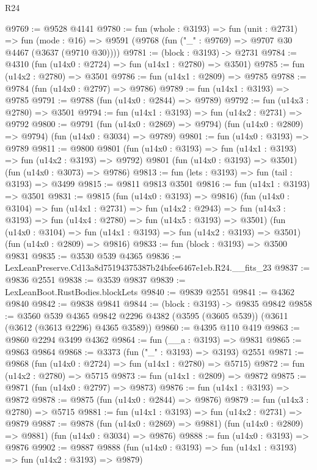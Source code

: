 \begin{lexlean}{R24}
\begin{coremodule}
@9769 := @9528 @4141
@9780 := fun (whole : @3193) =>
  fun (unit : @2731) =>
  fun (mode : @16) => @9591 (@9768 (fun ("_" : @9769) => @9707 @30 @4467 (@3637 (@9710 @30))))
@9781 := (block : @3193) -> @2731
@9784 := @4310 (fun (u14x0 : @2724) => fun (u14x1 : @2780) => @3501)
@9785 := fun (u14x2 : @2780) => @3501
@9786 := fun (u14x1 : @2809) => @9785
@9788 := @9784 (fun (u14x0 : @2797) => @9786)
@9789 := fun (u14x1 : @3193) => @9785
@9791 := @9788 (fun (u14x0 : @2844) => @9789)
@9792 := fun (u14x3 : @2780) => @3501
@9794 := fun (u14x1 : @3193) => fun (u14x2 : @2731) => @9792
@9800 := @9791
    (fun (u14x0 : @2869) => @9794)
    (fun (u14x0 : @2809) => @9794)
    (fun (u14x0 : @3034) => @9789)
@9801 := fun (u14x0 : @3193) => @9789
@9811 := @9800
    @9801
    (fun (u14x0 : @3193) => fun (u14x1 : @3193) => fun (u14x2 : @3193) => @9792)
    @9801
    (fun (u14x0 : @3193) => @3501)
    (fun (u14x0 : @3073) => @9786)
@9813 := fun (lets : @3193) => fun (tail : @3193) => @3499
@9815 := @9811 @9813 @3501
@9816 := fun (u14x1 : @3193) => @3501
@9831 := @9815
    (fun (u14x0 : @3193) => @9816)
    (fun (u14x0 : @3104) =>
    fun (u14x1 : @2731) =>
    fun (u14x2 : @2943) =>
    fun (u14x3 : @3193) => fun (u14x4 : @2780) => fun (u14x5 : @3193) => @3501)
    (fun (u14x0 : @3104) => fun (u14x1 : @3193) => fun (u14x2 : @3193) => @3501)
    (fun (u14x0 : @2809) => @9816)
@9833 := fun (block : @3193) => @3500 @9831
@9835 := @3530 @539 @4365
@9836 := LexLeanPreserve.Cd13a8d75194375387b24bfee6467e1eb.R24.__fits_23
@9837 := @9836 @2551
@9838 := @3539 @9837
@9839 := LexLeanBoot.RustBodies.blockLets
@9840 := @9839 @2551
@9841 := @4362 @9840
@9842 := @9838 @9841
@9844 := (block : @3193) -> @9835 @9842
@9858 := @3560
    @539
    @4365
    @9842
    @2296
    @4382
    (@3595 (@3605 @539))
    (@3611 (@3612 (@3613 @2296) @4365 @3589))
@9860 := @4395 @110 @419
@9863 := @9860 @2294 @3499 @4362
@9864 := fun (__a : @3193) => @9831
@9865 := @9863 @9864
@9868 := @3373 (fun ("_" : @3193) => @3193) @2551
@9871 := @9868 (fun (u14x0 : @2724) => fun (u14x1 : @2780) => @5715)
@9872 := fun (u14x2 : @2780) => @5715
@9873 := fun (u14x1 : @2809) => @9872
@9875 := @9871 (fun (u14x0 : @2797) => @9873)
@9876 := fun (u14x1 : @3193) => @9872
@9878 := @9875 (fun (u14x0 : @2844) => @9876)
@9879 := fun (u14x3 : @2780) => @5715
@9881 := fun (u14x1 : @3193) => fun (u14x2 : @2731) => @9879
@9887 := @9878
    (fun (u14x0 : @2869) => @9881)
    (fun (u14x0 : @2809) => @9881)
    (fun (u14x0 : @3034) => @9876)
@9888 := fun (u14x0 : @3193) => @9876
@9902 := @9887
    @9888
    (fun (u14x0 : @3193) => fun (u14x1 : @3193) => fun (u14x2 : @3193) => @9879)

\end{coremodule}
\end{lexlean}
